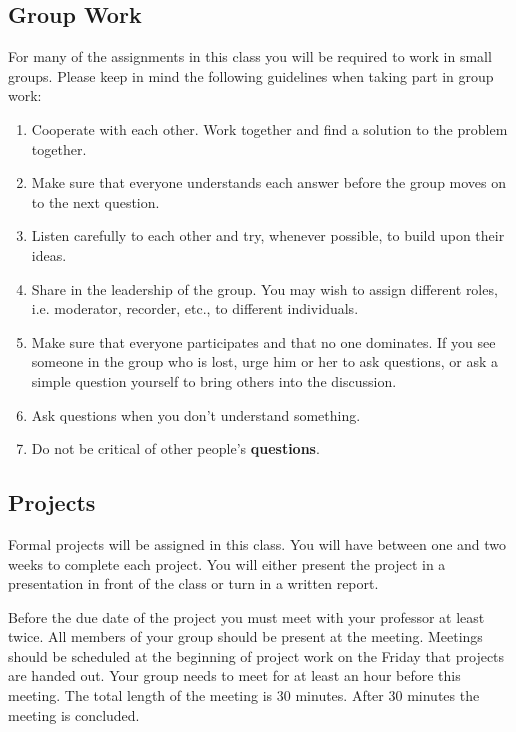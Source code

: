 \subsection{Group Work} 
For many of the assignments in this class you will be required to work
in small groups.  Please keep in mind the following guidelines when
taking part in group work: 
\begin{enumerate}
\item Cooperate with each other. Work together and find a solution to
  the problem together.

\item Make sure that everyone understands each answer before the group
  moves on to the next question.

\item Listen carefully to each other and try, whenever possible, to
  build upon their ideas.

\item Share in the leadership of the group.  You may wish to assign
  different roles, i.e. moderator, recorder, etc., to different
  individuals.
  
\item Make sure that everyone participates and that no one dominates.
  If you see someone in the group who is lost, urge him or her to ask
  questions, or ask a simple question yourself to bring others into
  the discussion.

\item Ask questions when you don't understand something.

\item Do not be critical of other people's \textbf{questions}.
\end{enumerate}



\subsection{Projects} 
Formal projects will be assigned in this class. You will have between
one and two weeks to complete each project. You will either present
the project in a presentation in front of the class or turn in a
written report. 

Before the due date of the project you must meet with your professor
at least twice. All members of your group should be present at the
meeting. Meetings should be scheduled at the beginning of project work
on the Friday that projects are handed out.   Your
group needs to meet for at least an hour before this meeting. The
total length of the meeting is 30 minutes. After 30 minutes the
meeting is concluded.

